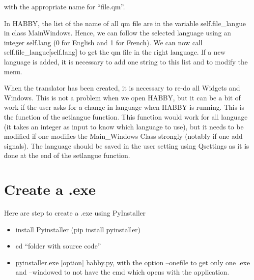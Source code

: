 \documentclass[letterpaper,10pt,english]{sphinxmanual}
\begin{document}
with the appropriate name for “file.qm”.

In HABBY, the list of the name of all qm file are in the variable self.file\_langue
in class MainWindows. Hence, we can follow the selected language using an integer self.lang
(0 for English and 1 for French). We can now call self.file\_langue{[}self.lang{]} to get the qm
file in the right language. If a new language is added, it is necessary to add one string to this
list and to modify the menu.

When the translator has been created, it is necessary to re-do all Widgets and Windows. This is not a problem when we open HABBY, but it can be a bit of work if the user asks for a change in language when HABBY is running. This is the function of the setlangue function. This function would work for all language (it takes an integer as input to know which language to use), but it needs to be modified if one modifies the Main\_Windows Class strongly (notably if one add signals).
The language should be saved in the user setting using Qsettings as it is done at the end of the
setlangue function.


\section{Create a .exe}
\label{\detokenize{index:create-a-exe}}
Here are step to create a .exe using PyInstaller
\begin{itemize}
\item {} 
install Pyinstaller (pip install pyinstaller)

\item {} 
cd ``folder with source code''

\item {} 
pyinstaller.exe {[}option{]} habby.py, with the option --onefile to get only one .exe and --windowed to not have the cmd which opens with the application.

\end{itemize}
\end{document}
